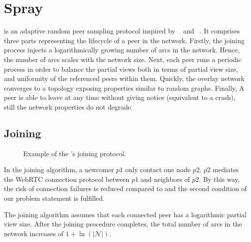 
\section{Spray}
\label{sec:proposal}

\SPRAY{} is an adaptive random peer sampling protocol inspired by
\SCAMP{}~\cite{ganesh2003peer} and
\CYCLON{}~\cite{voulgaris2005cyclon}. It comprises three parts
representing the lifecycle of a peer in the network.  Firstly, the
joining process injects a logarithmically growing number of arcs in
the network. Hence, the number of arcs scales with the network size.
Next, each peer runs a periodic process in order to balance the
partial views both in terms of partial view size, and uniformity of
the referenced peers within them. Quickly, the overlay network
converges to a topology exposing properties similar to random
graphs. Finally, A peer is able to leave at any time without giving
notice (equivalent to a crash), still the network properties do not
degrade.

\subsection{Joining}

\begin{figure*}
  \centering
  \hspace{40pt}
  \hspace{40pt}
  \caption{\label{fig:joiningexample}Example of the \SPRAY{}'s joining
    protocol.}
\end{figure*}



In the \SPRAY{} joining algorithm, a newcomer $p1$ only contact one
node $p2$. $p2$ mediates the WebRTC connection protocol between $p1$
and neighbors of $p2$. By this way, the risk of connection failures is
reduced compared to \SCAMP{} and the second condition of our problem
statement is fulfilled.

The \SPRAY{} joining algorithm assumes that each connected peer has a
logarithmic partial view size. After the joining procedure completes,
the total number of arcs in the network increases of
$1+\ln(|\mathcal{N}|)$.


